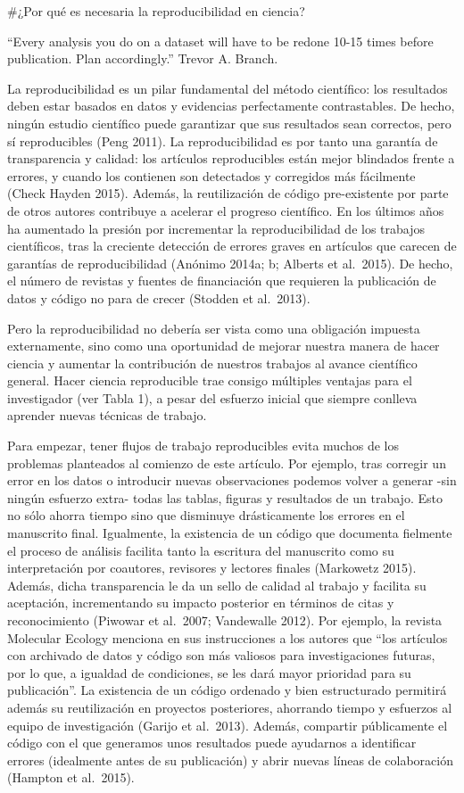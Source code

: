 \documentclass[]{tufte-handout}
\begin{document}
\#¿Por qué es necesaria la reproducibilidad en ciencia?

``Every analysis you do on a dataset will have to be redone 10-15 times
before publication. Plan accordingly.'' Trevor A. Branch.

La reproducibilidad es un pilar fundamental del método científico: los
resultados deben estar basados en datos y evidencias perfectamente
contrastables. De hecho, ningún estudio científico puede garantizar que
sus resultados sean correctos, pero sí reproducibles (Peng 2011). La
reproducibilidad es por tanto una garantía de transparencia y calidad:
los artículos reproducibles están mejor blindados frente a errores, y
cuando los contienen son detectados y corregidos más fácilmente (Check
Hayden 2015). Además, la reutilización de código pre-existente por parte
de otros autores contribuye a acelerar el progreso científico. En los
últimos años ha aumentado la presión por incrementar la reproducibilidad
de los trabajos científicos, tras la creciente detección de errores
graves en artículos que carecen de garantías de reproducibilidad
(Anónimo 2014a; b; Alberts et al.~2015). De hecho, el número de revistas
y fuentes de financiación que requieren la publicación de datos y código
no para de crecer (Stodden et al.~2013).

Pero la reproducibilidad no debería ser vista como una obligación
impuesta externamente, sino como una oportunidad de mejorar nuestra
manera de hacer ciencia y aumentar la contribución de nuestros trabajos
al avance científico general. Hacer ciencia reproducible trae consigo
múltiples ventajas para el investigador (ver Tabla 1), a pesar del
esfuerzo inicial que siempre conlleva aprender nuevas técnicas de
trabajo.

Para empezar, tener flujos de trabajo reproducibles evita muchos de los
problemas planteados al comienzo de este artículo. Por ejemplo, tras
corregir un error en los datos o introducir nuevas observaciones podemos
volver a generar -sin ningún esfuerzo extra- todas las tablas, figuras y
resultados de un trabajo. Esto no sólo ahorra tiempo sino que disminuye
drásticamente los errores en el manuscrito final. Igualmente, la
existencia de un código que documenta fielmente el proceso de análisis
facilita tanto la escritura del manuscrito como su interpretación por
coautores, revisores y lectores finales (Markowetz 2015). Además, dicha
transparencia le da un sello de calidad al trabajo y facilita su
aceptación, incrementando su impacto posterior en términos de citas y
reconocimiento (Piwowar et al.~2007; Vandewalle 2012). Por ejemplo, la
revista Molecular Ecology menciona en sus instrucciones a los autores
que ``los artículos con archivado de datos y código son más valiosos
para investigaciones futuras, por lo que, a igualdad de condiciones, se
les dará mayor prioridad para su publicación''. La existencia de un
código ordenado y bien estructurado permitirá además su reutilización en
proyectos posteriores, ahorrando tiempo y esfuerzos al equipo de
investigación (Garijo et al.~2013). Además, compartir públicamente el
código con el que generamos unos resultados puede ayudarnos a
identificar errores (idealmente antes de su publicación) y abrir nuevas
líneas de colaboración (Hampton et al.~2015).
\end{document}
